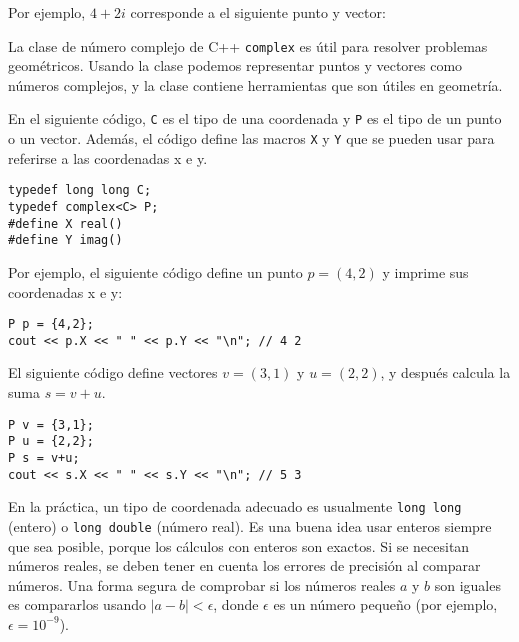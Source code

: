 Por ejemplo, $4+2i$ corresponde a
el siguiente punto y vector:

\begin{center}
\end{center}


La clase de número complejo de C++ \texttt{complex} es
útil para resolver problemas geométricos.
Usando la clase podemos representar puntos y vectores
como números complejos, y la clase contiene herramientas
que son útiles en geometría.

En el siguiente código, \texttt{C} es el tipo de
una coordenada y \texttt{P} es el tipo de un punto o un vector.
Además, el código define las macros \texttt{X} y \texttt{Y}
que se pueden usar para referirse a las coordenadas x e y.

\begin{lstlisting}
typedef long long C;
typedef complex<C> P;
#define X real()
#define Y imag()
\end{lstlisting}

Por ejemplo, el siguiente código define un punto $p=(4,2)$
y imprime sus coordenadas x e y:

\begin{lstlisting}
P p = {4,2};
cout << p.X << " " << p.Y << "\n"; // 4 2
\end{lstlisting}

El siguiente código define vectores $v=(3,1)$ y $u=(2,2)$,
y después calcula la suma $s=v+u$.

\begin{lstlisting}
P v = {3,1};
P u = {2,2};
P s = v+u;
cout << s.X << " " << s.Y << "\n"; // 5 3
\end{lstlisting}
En la práctica,
un tipo de coordenada adecuado es usualmente
\texttt{long long} (entero) o \texttt{long double}
(número real).
Es una buena idea usar enteros siempre que sea posible,
porque los cálculos con enteros son exactos.
Si se necesitan números reales,
se deben tener en cuenta los errores de precisión
al comparar números.
Una forma segura de comprobar si los números reales $a$ y $b$ son iguales
es compararlos usando $|a-b|<\epsilon$,
donde $\epsilon$ es un número pequeño (por ejemplo, $\epsilon=10^{-9}$).

